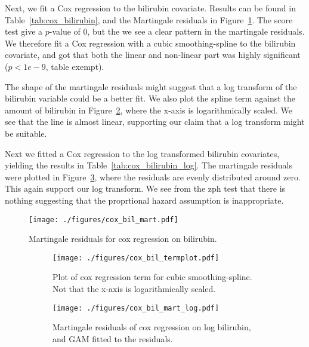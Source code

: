 \documentclass[11pt,a4paper]{article}
\begin{document}
Next, we fit a Cox regression to the bilirubin covariate. Results can be found in Table~\ref{tab:cox_bilirubin}, and the Martingale residuals in Figure~\ref{fig:cox_bil_mart}. The score test give a $p$-value of 0, but the we see a clear pattern in the martingale residuals. We therefore fit a Cox regression with a cubic smoothing-spline to the bilirubin covariate, and got that both the linear and non-linear part was highly significant ($p < 1e-9$, table exempt).

The shape of the martingale residuals might suggest that a log transform of the bilirubin variable could be a better fit. We also plot the spline term against the amount of bilirubin in Figure~\ref{fig:cox_bil_termplot}, where the x-axis is logarithmically scaled. We see that the line is almost linear, supporting our claim that a log transform might be suitable.

Next we fitted a Cox regression to the log transformed bilirubin covariates, yielding the results in Table~\ref{tab:cox_bilirubin_log}.
The martingale residuals were plotted in Figure~\ref{fig:cox_bil_mart_log}, where the residuals are evenly distributed around zero. This again support our log transform.
We see from the zph test that there is nothing suggesting that the proprtional hazard assumption is inappropriate. 



\begin{figure}[h!tb]
    \begin{center}
        \texttt{[image: ./figures/cox\_bil\_mart.pdf]}
    \end{center}
    \vspace{-0.2cm}
    \caption{Martingale residuals for cox regression on bilirubin.}
    \label{fig:cox_bil_mart}
\end{figure}

\begin{figure}[h!tbp]
    \centering
    \begin{subfigure}[b]{0.48\textwidth}
        \texttt{[image: ./figures/cox\_bil\_termplot.pdf]}
        \caption{Plot of cox regression term for cubic smoothing-spline. Not that the x-axis is logarithmically scaled.}
        \label{fig:cox_bil_termplot}
    \end{subfigure}%
    \quad
    \begin{subfigure}[b]{0.48\textwidth}
        \texttt{[image: ./figures/cox\_bil\_mart\_log.pdf]}
        \caption{Martingale residuals of cox regression on log bilirubin, and GAM fitted to the residuals.}
        \label{fig:cox_bil_mart_log}
    \end{subfigure}
    \vspace{1\baselineskip}
    \caption{}
    \label{fig:cox_bil_term_and_mart}
\end{figure}
\end{document}
